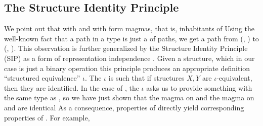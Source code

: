 \subsection{The Structure Identity Principle}
We point out that \bN{} with  and \bL{} with  form magmas, that is, inhabitants of
Using the well-known fact that a path in a  type is just a  of paths, we get a path from (\bN{}, ) to (\bL{}, ). %
This observation is further generalized by the Structure Identity Principle (SIP) as a form of representation independence \cite{iri}. Given a structure, which in our case is just a binary operation
this principle produces an appropriate definition ``structured equivalence'' $\iota$. The $\iota$ is such that if structures $X, Y$ are $\iota$-equivalent, then they are identified. In the case of , the $\iota$ asks us to provide something with the same type as , so we have just shown that the  magma on \bL{}
and the \AgdaFunction{\_+\_} magma on \bN{} and are identical
As a consequence, properties of \AgdaFunction{\_+\_} directly yield corresponding properties of . For example,
